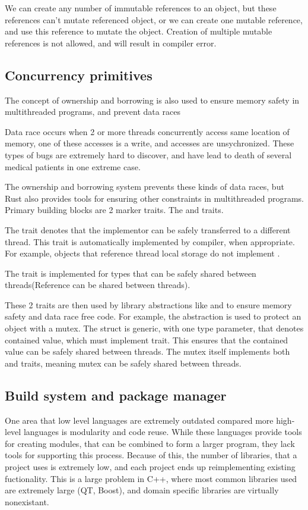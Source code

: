 We can create any number of immutable references to an object, but these references can't mutate referenced object, or
we can create one mutable reference, and use this reference to mutate the object. Creation of multiple mutable references
is not allowed, and will result in compiler error.

\subsection{Concurrency primitives}
The concept of ownership and borrowing is also used to ensure memory safety in multithreaded programs, and prevent
data races

Data race occurs when 2 or more threads concurrently access same location of memory, one of these accesses is a write,
and accesses are unsychronized. These types of bugs are extremely hard to discover, and have lead to death of several medical patients in
one extreme case\cite{article:therac}.

The ownership and borrowing system prevents these kinds of data races, but Rust also provides tools for ensuring other
constraints in multithreaded programs. Primary building blocks are 2 marker traits. The  and  traits.

The  trait denotes that the implementor can be safely transferred to a different thread. This trait is automatically
implemented by compiler, when appropriate. For example, objects that reference thread local storage do not implement .

The  trait is implemented for types that can be safely shared between threads(Reference can be shared between threads).

These 2 traits are then used by library abstractions like  and  to ensure memory safety and data race free code.
For example, the  abstraction is used to protect an object with a mutex. The  struct is generic,
with one type parameter, that denotes contained value, which must implement  trait.
This ensures that the contained value can be safely shared between threads. The mutex itself implements both  and  traits,
meaning mutex can be safely shared between threads.

\subsection{Build system and package manager}
One area that low level languages are extremely outdated compared more high-level languages is modularity and code reuse.
While these languages provide tools for creating modules, that can be combined to form a larger program, they lack tools
for supporting this process. Because of this, the number of libraries, that a project uses is extremely low, and
each project ends up reimplementing existing fuctionality. This is a large problem in C++, where most common
libraries used are extremely large (QT, Boost), and domain specific libraries are virtually nonexistant.

